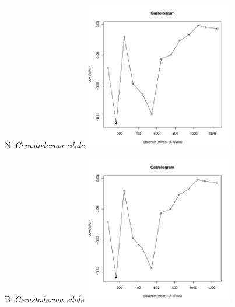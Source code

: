\documentclass[12pt, a4paper]{disser}
\begin{document}
\begin{figure}[h]
	
	\begin{minipage}[b]{.46\linewidth}
	\begin{center}
	{\small N~{\it Cerastoderma edule}}
		\includegraphics[width=65mm]{../Barenc_Sea/distribution_Moran/Plyazh081_moran_B_Cerastoderma_edule_.pdf}

	\end{center}
	\end{minipage}
	\hfil %
	\begin{minipage}[b]{.46\linewidth}
	\begin{center}
	{\small B~{\it Cerastoderma edule}}
		\includegraphics[width=65mm]{../Barenc_Sea/distribution_Moran/Plyazh081_moran_B_Cerastoderma_edule_.pdf}
	\end{center}
	\end{minipage}






\end{figure}
\end{document}
